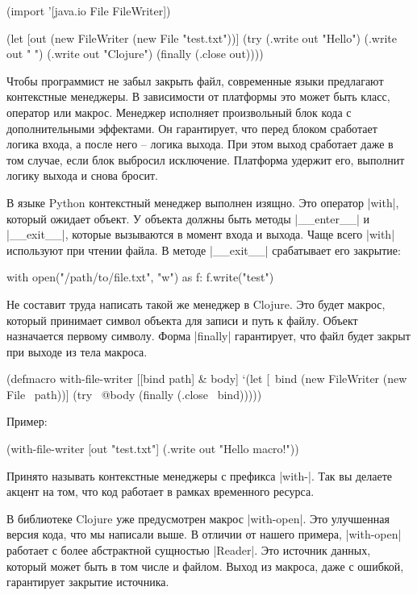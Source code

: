 \begin{code}
(import '[java.io File FileWriter])

(let [out (new FileWriter (new File "test.txt"))]
  (try
    (.write out "Hello")
    (.write out " ")
    (.write out "Clojure")
    (finally
      (.close out))))
\end{code}

Чтобы программист не забыл закрыть файл, современные языки предлагают
контекстные менеджеры. В зависимости от платформы это может быть класс, оператор
или макрос. Менеджер исполняет произвольный блок кода с дополнительными
эффектами. Он гарантирует, что перед блоком сработает логика входа, а после него
-- логика выхода. При этом выход сработает даже в том случае, если блок выбросил
исключение. Платформа удержит его, выполнит логику выхода и снова бросит.

В языке Python контекстный менеджер выполнен изящно. Это оператор \spverb|with|,
который ожидает объект. У объекта должны быть методы \spverb|__enter__| и \spverb|__exit__|,
которые вызываются в момент входа и выхода. Чаще всего \spverb|with| используют при
чтении файла. В методе \spverb|__exit__| срабатывает его закрытие:

\begin{code}
with open("/path/to/file.txt", "w") as f:
    f.write("test")
\end{code}

Не составит труда написать такой же менеджер в Clojure. Это будет макрос,
который принимает символ объекта для записи и путь к файлу. Объект назначается
первому символу. Форма \spverb|finally| гарантирует, что файл будет закрыт при выходе
из тела макроса.

\begin{code}
(defmacro with-file-writer
  [[bind path] & body]
  `(let [~bind (new FileWriter (new File ~path))]
     (try
       ~@body
       (finally
         (.close ~bind)))))
\end{code}

Пример:

\begin{code}
(with-file-writer [out "test.txt"]
  (.write out "Hello macro!"))
\end{code}

Принято называть контекстные менеджеры с префикса \spverb|with-|. Так вы делаете акцент
на том, что код работает в рамках временного ресурса.

В библиотеке Clojure уже предусмотрен макрос \spverb|with-open|. Это улучшенная версия
кода, что мы написали выше. В отличии от нашего примера, \spverb|with-open| работает с
более абстрактной сущностью \spverb|Reader|. Это источник данных, который может быть в
том числе и файлом. Выход из макроса, даже с ошибкой, гарантирует закрытие
источника.

